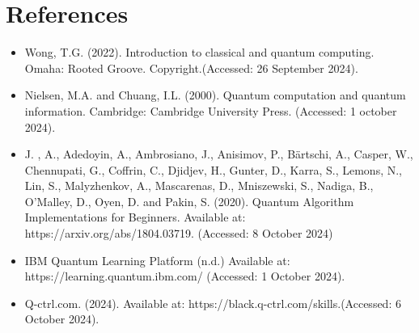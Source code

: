 \newpage














\section*{\LARGE References}

\begin{itemize}
    \item Wong, T.G. (2022). Introduction to classical and quantum computing. Omaha: Rooted Groove. Copyright.(Accessed: 26 September 2024).
    \item Nielsen, M.A. and Chuang, I.L. (2000). Quantum computation and quantum information. Cambridge: Cambridge University Press. (Accessed: 1 october 2024).
    \item J. , A., Adedoyin, A., Ambrosiano, J., Anisimov, P., Bärtschi, A., Casper, W., Chennupati, G., Coffrin, C., Djidjev, H., Gunter, D., Karra, S., Lemons, N., Lin, S., Malyzhenkov, A., Mascarenas, D., Mniszewski, S., Nadiga, B., O’Malley, D., Oyen, D. and Pakin, S. (2020). Quantum Algorithm Implementations for Beginners. Available at: https://arxiv.org/abs/1804.03719. (Accessed: 8 October 2024)
    \item IBM Quantum Learning Platform (n.d.) Available at: https://learning.quantum.ibm.com/ (Accessed: 1 October 2024).
    \item Q-ctrl.com. (2024). Available at: https://black.q-ctrl.com/skills.(Accessed: 6 October 2024).
\end{itemize}

